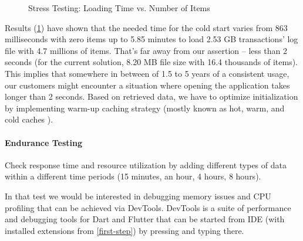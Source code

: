 \begin{figure}
\caption{Stress Testing: Loading Time vs. Number of Items} \label{t-stress}
\end{figure}

\noindent Results (\cref{t-stress}) have shown that the needed time for the cold start varies from 863 milliseconds  
with zero items up to 5.85 minutes to load 2.53 GB transactions' log file with 4.7 millions of items. That's far away 
from our assertion -- less than 2 seconds (for the current solution, 8.20 MB file size with 16.4 thousands of items).
This implies that somewhere in between of 1.5 to 5 years of a consistent usage, our customers might encounter a 
situation where opening the application takes longer than 2 seconds. Based on retrieved data, we have to optimize  
initialization by implementing warm-up caching strategy (mostly known as hot, warm, and cold caches \cite{Tom17}). 


\paragraph{Endurance Testing}
Check response time and resource utilization by adding different types of data within a different time 
periods (15 minutes, an hour, 4 hours, 8 hours).

In that test we would be interested in debugging memory issues and CPU profiling that can be achieved via DevTools.
DevTools is a suite of performance and debugging tools for Dart and Flutter that can be started from IDE 
(with installed extensions from \ref{first-step}) by pressing \q{[F1]} and typing  there.

